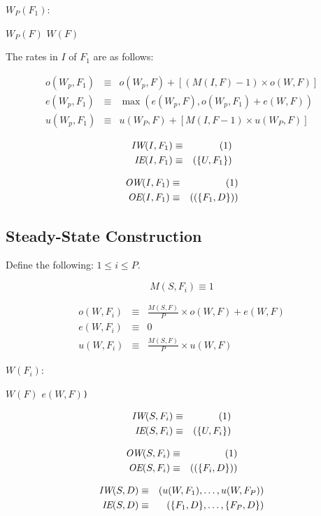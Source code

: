 \begin{algorithm}
$W_P(F_1)$:
\begin{algorithmic}[1]
\State $W_P(F)$
\State $W(F)$
\EndFor
\end{algorithmic}
\end{algorithm}

The rates in $I$ of $F_1$ are as follows:
 
\begin{eqnarray*} 
o(W_p,F_1) & \equiv & o(W_p,F) + [(M(I,F) - 1) \times o(W,F)] \\
e(W_p,F_1) & \equiv & \max(e(W_p,F), o(W_p,F_1) + e(W,F)) \\
u(W_p,F_1) & \equiv & u(W_P,F) + [M(I,F - 1) \times u(W_P,F)]
\end{eqnarray*} 

\begin{eqnarray*}
\mbox{\it IW}(I,F_1) & \equiv & (1) \\
\mbox{\it IE}(I,F_1) & \equiv & (\{U,F_1\}) 
\end{eqnarray*}

\begin{eqnarray*} 
\mbox{\it OW}(I,F_1) & \equiv & (1) \\
\mbox{\it OE}(I,F_1) & \equiv & ((\{F_1, D\})) 
\end{eqnarray*} 

\subsection{Steady-State Construction}
Define the following: $1 \le i \le P$.
 
$$ M(S,F_i) \equiv 1 $$

\begin{eqnarray*} 
o(W,F_i) & \equiv & \frac{M(S,F)}{P} \times o(W,F) + e(W,F)\\
e(W,F_i) & \equiv & 0 \\
u(W,F_i) & \equiv & \frac{M(S,F)}{P} \times u(W,F)
\end{eqnarray*} 

\begin{algorithm}
$W(F_i)$:
\begin{algorithmic}[1]
\State $W(F)$
\EndFor
{}$e(W,F)${\tt)}
\end{algorithmic}
\end{algorithm}

\begin{eqnarray*}
\mbox{\it IW}(S,F_i) & \equiv & (1) \\
\mbox{\it IE}(S,F_i) & \equiv & (\{U,F_i\}) 
\end{eqnarray*}

\begin{eqnarray*} 
\mbox{\it OW}(S,F_i) & \equiv & (1) \\
\mbox{\it OE}(S,F_i) & \equiv & ((\{F_i, D\})) 
\end{eqnarray*} 

\begin{eqnarray*}
\mbox{\it IW}(S,D) & \equiv & (u(W,F_1),\ldots,u(W, F_P)) \\
\mbox{\it IE}(S,D) & \equiv & (\{F_1, D\},\dots,\{F_P, D\}) 
\end{eqnarray*}
